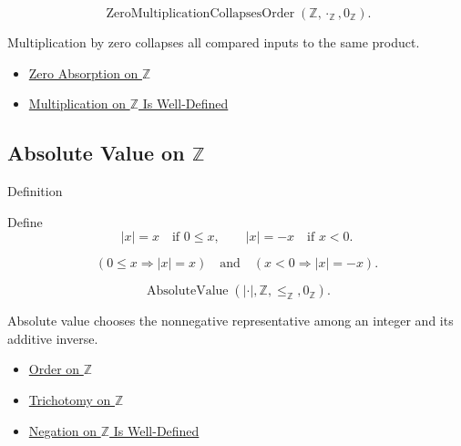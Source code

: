 \begin{remark*}
\[
\operatorname{ZeroMultiplicationCollapsesOrder}(\mathbb{Z},\cdot_{\mathbb{Z}},0_{\mathbb{Z}}).
\]
\end{remark*}

\begin{remark*}[Interpretation]
Multiplication by zero collapses all compared inputs to the same product.
\end{remark*}

\begin{dependencies}
\begin{itemize}
  \item \hyperref[cor:zero-absorption-on-z]{Zero Absorption on $\mathbb{Z}$}
  \item \hyperref[thm:multiplication-on-z-well-defined]{Multiplication on $\mathbb{Z}$ Is Well-Defined}
\end{itemize}
\end{dependencies}

\subsection*{\texorpdfstring{Absolute Value on $\mathbb{Z}$}{Absolute Value on Z}}

\begin{definitionbox}{Definition}
\begin{definition}
\label{def:absolute-value-on-z}
Define
\[
|x|=x\quad\text{if }0\le x,
\qquad
|x|=-x\quad\text{if }x<0.
\]
\end{definition}
\end{definitionbox}

\begin{remark*}
\[
(0\le x\Longrightarrow |x|=x)
\quad\text{and}\quad
(x<0\Longrightarrow |x|=-x).
\]
\end{remark*}

\begin{remark*}
\[
\operatorname{AbsoluteValue}(|\cdot|,\mathbb{Z},\le_{\mathbb{Z}},0_{\mathbb{Z}}).
\]
\end{remark*}

\begin{remark*}[Interpretation]
Absolute value chooses the nonnegative representative among an integer and its
additive inverse.
\end{remark*}

\begin{dependencies}
\begin{itemize}
  \item \hyperref[def:order-on-z]{Order on $\mathbb{Z}$}
  \item \hyperref[thm:trichotomy-on-z]{Trichotomy on $\mathbb{Z}$}
  \item \hyperref[thm:negation-on-z-well-defined]{Negation on $\mathbb{Z}$ Is Well-Defined}
\end{itemize}
\end{dependencies}

